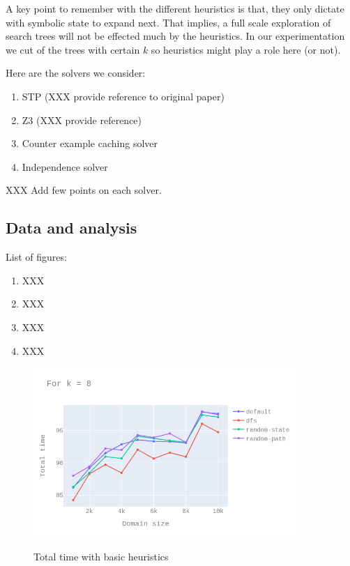 \documentclass[11pt,a4paper,notitlepage]{article}
\begin{document}
A key point to remember with the different heuristics is that, they only dictate with symbolic state to expand next.
That implies, a full scale exploration of search trees will not be effected much by the heuristics.
In our experimentation we cut of the trees with certain $k$ so heuristics might play a role here (or not).

Here are the solvers we consider:
\begin{enumerate}
\item STP (XXX provide reference to original paper)
\item Z3 (XXX provide reference)
\item Counter example  caching solver
\item Independence solver
\end{enumerate}

XXX Add few points on each solver.

\subsection{Data and analysis}
\label{subsec:dataandanalysis}

List of figures:
\begin{enumerate}
\item XXX
\item XXX
\item XXX
\item XXX
\end{enumerate}

\begin{figure}[h]
\centering
\includegraphics[width=10cm]{k_8_tt_basic_heur.png}
\label{fig:basic_heur_tt}
\caption{Total time with basic heuristics}
\centering
\end{figure}
\end{document}
